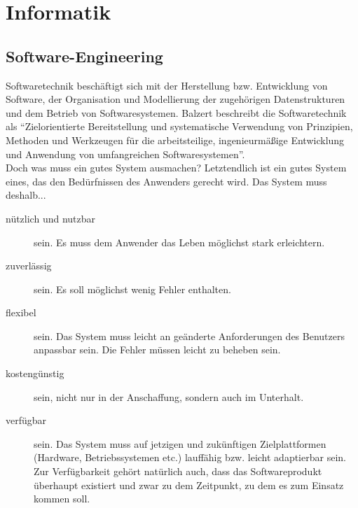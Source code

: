 \documentclass[a4paper,10pt,DIV9, BCOR12mm, oneside,openright,openbib]{scrreprt}
\theoremstyle{definition}
\theoremstyle{plain}
\begin{document}
\part{Informatik}
\chapter{Software-Engineering}

Softwaretechnik beschäftigt sich mit der Herstellung bzw. Entwicklung von Software, der Organisation und Modellierung der zugehörigen Datenstrukturen und dem Betrieb von Softwaresystemen.
Balzert beschreibt die Softwaretechnik als ``Zielorientierte Bereitstellung und systematische Verwendung von Prinzipien, Methoden und Werkzeugen für die arbeitsteilige, ingenieurmäßige Entwicklung und Anwendung von umfangreichen Softwaresystemen''\cite{Balzert1996}. \\
Doch was muss ein gutes System ausmachen?
Letztendlich ist ein gutes System eines, das den Bedürfnissen des Anwenders gerecht wird.
Das System muss deshalb... \cite{Andelfinger2005}
\begin{description}
\item[nützlich und nutzbar]  sein. Es muss dem Anwender das Leben möglichst stark erleichtern.
\item[zuverlässig] sein. Es soll möglichst wenig Fehler enthalten.
\item[flexibel] sein. Das System muss leicht an geänderte Anforderungen des Benutzers anpassbar sein. Die Fehler müssen leicht zu beheben sein.
\item[kostengünstig]  sein, nicht nur in der Anschaffung, sondern auch im Unterhalt.
\item[verfügbar] sein. Das System muss auf jetzigen und zukünftigen Zielplattformen (Hardware, Betriebssystemen etc.) lauffähig bzw. leicht adaptierbar sein. Zur Verfügbarkeit gehört natürlich auch, dass das Softwareprodukt überhaupt existiert und zwar zu dem Zeitpunkt, zu dem es zum Einsatz kommen soll.
\end{description}
\newpage
\end{document}
